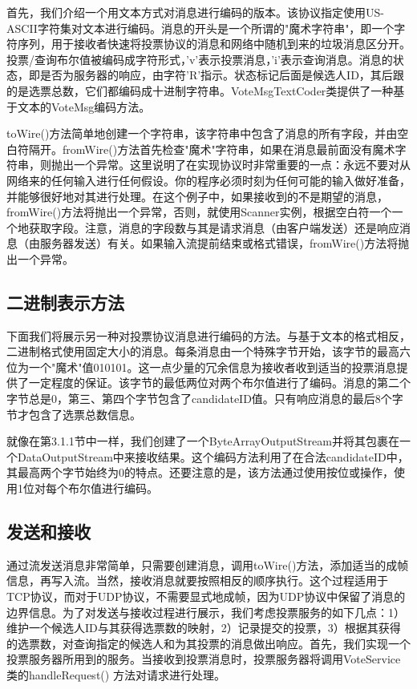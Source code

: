 		首先，我们介绍一个用文本方式对消息进行编码的版本。该协议指定使用US-ASCII字符集对文本进行编码。消息的开头是一个所谓的"魔术字符串"，即一个字符序列，用于接收者快速将投票协议的消息和网络中随机到来的垃圾消息区分开。投票/查询布尔值被编码成字符形式，'v'表示投票消息，'i'表示查询消息。消息的状态，即是否为服务器的响应，由字符'R'指示。状态标记后面是候选人ID，其后跟的是选票总数，它们都编码成十进制字符串。VoteMsgTextCoder类提供了一种基于文本的VoteMsg编码方法。 

		

		toWire()方法简单地创建一个字符串，该字符串中包含了消息的所有字段，并由空白符隔开。fromWire()方法首先检查"魔术"字符串，如果在消息最前面没有魔术字符串，则抛出一个异常。这里说明了在实现协议时非常重要的一点：永远不要对从网络来的任何输入进行任何假设。你的程序必须时刻为任何可能的输入做好准备，并能够很好地对其进行处理。在这个例子中，如果接收到的不是期望的消息，fromWire()方法将抛出一个异常，否则，就使用Scanner实例，根据空白符一个一个地获取字段。注意，消息的字段数与其是请求消息（由客户端发送）还是响应消息（由服务器发送）有关。如果输入流提前结束或格式错误，fromWire()方法将抛出一个异常。 

	\subsection{二进制表示方法} 

		下面我们将展示另一种对投票协议消息进行编码的方法。与基于文本的格式相反，二进制格式使用固定大小的消息。每条消息由一个特殊字节开始，该字节的最高六位为一个"魔术"值010101。这一点少量的冗余信息为接收者收到适当的投票消息提供了一定程度的保证。该字节的最低两位对两个布尔值进行了编码。消息的第二个字节总是0，第三、第四个字节包含了candidateID值。只有响应消息的最后8个字节才包含了选票总数信息。 

		

		就像在第3.1.1节中一样，我们创建了一个ByteArrayOutputStream并将其包裹在一个DataOutputStream中来接收结果。这个编码方法利用了在合法candidateID中，其最高两个字节始终为0的特点。还要注意的是，该方法通过使用按位或操作，使用1位对每个布尔值进行编码。 

	\subsection{发送和接收} 

		通过流发送消息非常简单，只需要创建消息，调用toWire()方法，添加适当的成帧信息，再写入流。当然，接收消息就要按照相反的顺序执行。这个过程适用于TCP协议，而对于UDP协议，不需要显式地成帧，因为UDP协议中保留了消息的边界信息。为了对发送与接收过程进行展示，我们考虑投票服务的如下几点：1）维护一个候选人ID与其获得选票数的映射，2）记录提交的投票，3）根据其获得的选票数，对查询指定的候选人和为其投票的消息做出响应。首先，我们实现一个投票服务器所用到的服务。当接收到投票消息时，投票服务器将调用VoteService类的handleRequest() 方法对请求进行处理。 


